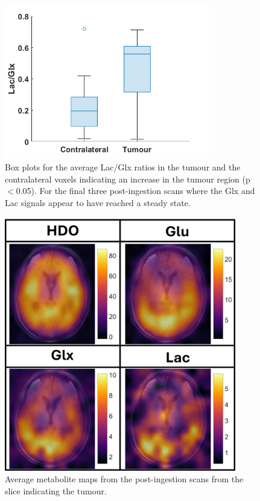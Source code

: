 \begin{figure}[H]
    \centering
    \includegraphics[width = 0.8\textwidth]{Figures/Conclusion/BarChart.png}
    \caption{Box plots for the average Lac/Glx ratios in the tumour and the contralateral voxels indicating an increase in the tumour region (p$<$0.05). For the final three post-ingestion scans where the Glx and Lac signals appear to have reached a steady state.}
    \label{fig:Conc:Box}
\end{figure}

\begin{figure}[H]
    \centering
    \includegraphics[width = 0.9\textwidth]{Figures/Conclusion/Maps.png}
    \caption{Average metabolite maps from the post-ingestion scans from the slice indicating the tumour.}
    \label{fig:Conc:Maps}
\end{figure}

